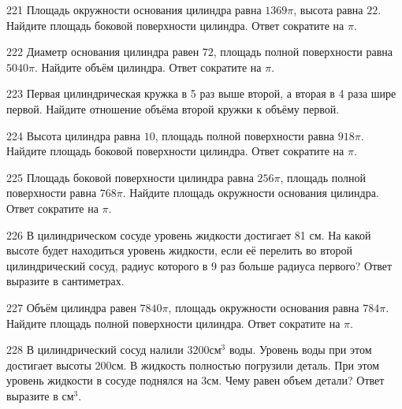 \documentclass[4apaper]{article}
\begin{document}
\begin{taskBN}{221}
Площадь окружности основания цилиндра равна $1369\pi$, высота равна $22$. Найдите площадь боковой поверхности цилиндра. Ответ сократите на $\pi$.
\end{taskBN}

\begin{taskBN}{222}
Диаметр основания цилиндра равен $72$, площадь полной поверхности равна $5040\pi$. Найдите объём цилиндра. Ответ сократите на $\pi$.
\end{taskBN}

\begin{taskBN}{223}
 Первая цилиндрическая кружка в 5 раз выше второй, а вторая в 4 раза шире первой. Найдите отношение объёма второй кружки к объёму первой.
\end{taskBN}

\begin{taskBN}{224}
Высота цилиндра равна $10$, площадь полной поверхности равна $918\pi$. Найдите площадь боковой поверхности цилиндра. Ответ сократите на $\pi$.
\end{taskBN}

\begin{taskBN}{225}
Площадь боковой поверхности цилиндра равна $256\pi$, площадь полной поверхности равна $768\pi$. Найдите площадь окружности основания цилиндра. Ответ сократите на $\pi$.
\end{taskBN}

\begin{taskBN}{226}
В цилиндрическом сосуде уровень жидкости достигает 81 см. На какой высоте будет находиться уровень жидкости, если её перелить во второй цилиндрический сосуд, радиус которого в 9 раз больше радиуса первого? Ответ выразите в сантиметрах.
\end{taskBN}

\begin{taskBN}{227}
Объём цилиндра равен $7840\pi$, площадь окружности основания равна $784\pi$. Найдите площадь полной поверхности цилиндра. Ответ сократите на $\pi$.
\end{taskBN}

\begin{taskBN}{228}
В цилиндрический сосуд налили $3200\mbox{см}^3$ воды. Уровень воды при этом достигает высоты $200$см. В жидкость полностью погрузили деталь. При этом уровень жидкости в сосуде поднялся на $3$см. Чему равен объем детали? Ответ выразите в $\mbox{см}^3$.
\end{taskBN}
\end{document}
